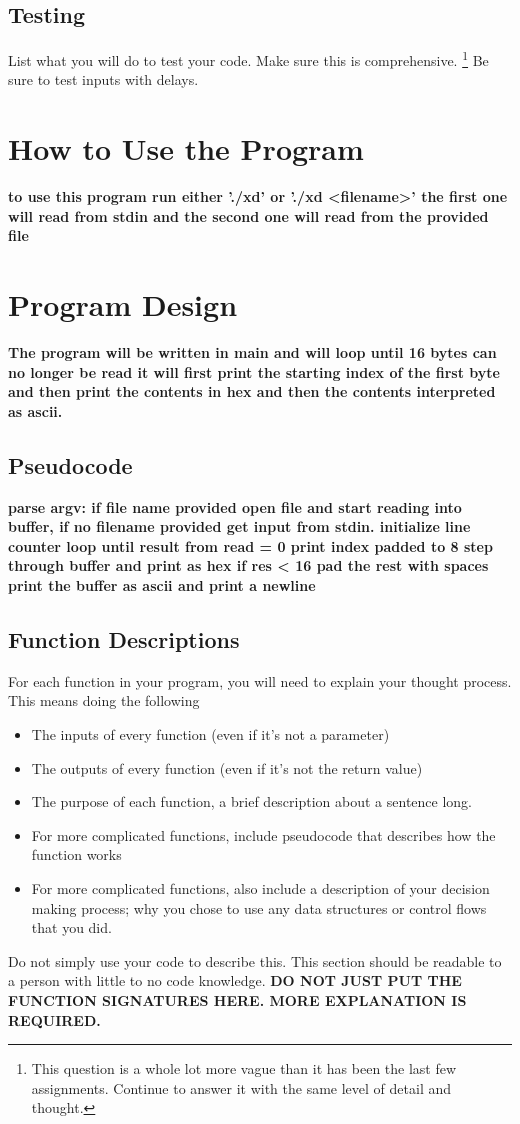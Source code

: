 \documentclass{article}
\begin{document}
\subsection*{Testing}
List what you will do to test your code. Make sure this is comprehensive. \footnote{This question is a whole lot more vague than it has been the last few assignments. Continue to answer it with the same level of detail and thought.} Be sure to test inputs with delays. 


\section*{How to Use the Program}

\textbf{to use this program run either './xd' or './xd <filename>' the first one will read from stdin and the second one will read from the provided file}

\section*{Program Design}

\textbf{The program will be written in main and will loop until 16 bytes can no longer be read it will first print the starting index of the first byte and then print the contents in hex and then the contents interpreted as ascii.}

\subsection*{Pseudocode}

\textbf{parse argv: if file name provided open file and start reading into buffer, if no filename provided get input from stdin.
initialize line counter
loop until result from read = 0
print index padded to 8
step through buffer and print as hex
if res < 16 pad the rest with spaces
print the buffer as ascii and print a newline}

\subsection*{Function Descriptions}
For each function in your program, you will need to explain your thought process. This means doing the following
\begin{itemize}
    \item The inputs of every function (even if it's not a parameter)
    \item The outputs of every function (even if it's not the return value)
    \item The purpose of each function, a brief description about a sentence long. 
    \item For more complicated functions, include pseudocode that describes how the function works
    \item For more complicated functions, also include a description of your decision making process; why you chose to use any data structures or control flows that you did.
\end{itemize}
Do not simply use your code to describe this. This section should be readable to a person with little to no code knowledge. 
\textbf{DO NOT JUST PUT THE FUNCTION SIGNATURES HERE. MORE EXPLANATION IS REQUIRED.}
\end{document}

